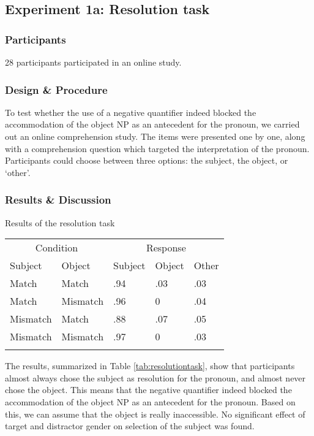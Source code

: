 \documentclass[11pt]{article} %
\begin{document}
\subsection{Experiment 1a: Resolution task}
\subsubsection{Participants}
28 participants participated in an online study.

\subsubsection{Design \& Procedure}
To test whether the use of a negative quantifier indeed blocked the accommodation of the object NP as an antecedent for the pronoun, we carried out an online comprehension study. The items were presented one by one, along with a comprehension question which targeted the interpretation of the pronoun. Participants could choose between three options: the subject, the object, or `other'. 


\subsubsection{Results \& Discussion}

\begin{threeparttable}
\caption{\label{tab:resolutiontask}Results of the resolution task}
       	\begin{tabular}{ll | lll}

	\multicolumn{2}{c}{Condition} & \multicolumn{3}{c}{Response} \\
	Subject & Object & Subject & Object & Other \\
	\hline
	Match & Match & .94 & .03 & .03 \\
	Match & Mismatch & .96 & 0 & .04 \\
	Mismatch & Match & .88 & .07 & .05 \\
	Mismatch & Mismatch & .97 & 0 & .03 \\\\
	\end{tabular}
\end{threeparttable}
\bigskip

The results, summarized in Table \ref{tab:resolutiontask}, show that participants almost always chose the subject as resolution for the pronoun, and almost never chose the object. This means that the negative quantifier indeed blocked the accommodation of the object NP as an antecedent for the pronoun. Based on this, we can assume that the object is really inaccessible. No significant effect of target and distractor gender on selection of the subject was found. 
\end{document}
